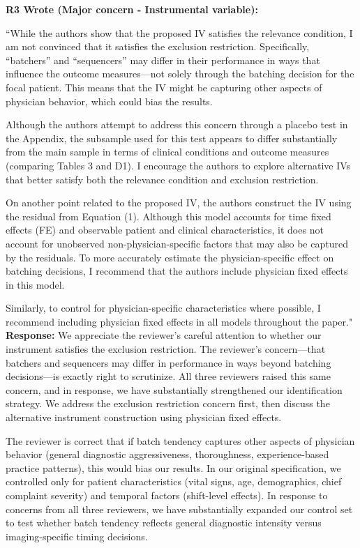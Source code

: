\documentclass[11pt]{article}
\newenvironment{quote2}
{ \bigskip
\noindent
         \small\em
         \baselineskip=14pt
}
\newcommand{\1}{\hbox{\rm 1\kern-.35em 1}}
\begin{document}
\begin{quote2}
\textbf{R3 Wrote (Major concern - Instrumental variable):}  

\noindent``While the authors show that the proposed IV satisfies the relevance condition, I am not convinced that it satisfies the exclusion restriction. Specifically, “batchers” and “sequencers” may differ in their performance in ways that influence the outcome measures—not solely through the batching decision for the focal patient. This means that the IV might be capturing other aspects of physician behavior, which could bias the results.

Although the authors attempt to address this concern through a placebo test in the Appendix, the subsample used for this test appears to differ substantially from the main sample in terms of clinical conditions and outcome measures (comparing Tables 3 and D1). I encourage the authors to explore alternative IVs that better satisfy both the relevance condition and exclusion restriction.

On another point related to the proposed IV, the authors construct the IV using the residual from Equation (1). Although this model accounts for time fixed effects (FE) and observable patient and clinical characteristics, it does not account for unobserved non-physician-specific factors that may also be captured by the residuals. To more accurately estimate the physician-specific effect on batching decisions, I recommend that the authors include physician fixed effects in this model.

Similarly, to control for physician-specific characteristics where possible, I recommend including physician fixed effects in all models throughout the paper."
\end{quote2}

\noindent\textbf{Response:} \color{blue}We appreciate the reviewer's careful attention to whether our instrument satisfies the exclusion restriction. The reviewer's concern—that batchers and sequencers may differ in performance in ways beyond batching decisions—is exactly right to scrutinize. All three reviewers raised this same concern, and in response, we have substantially strengthened our identification strategy. We address the exclusion restriction concern first, then discuss the alternative instrument construction using physician fixed effects.

The reviewer is correct that if batch tendency captures other aspects of physician behavior (general diagnostic aggressiveness, thoroughness, experience-based practice patterns), this would bias our results. In our original specification, we controlled only for patient characteristics (vital signs, age, demographics, chief complaint severity) and temporal factors (shift-level effects). In response to concerns from all three reviewers, we have substantially expanded our control set to test whether batch tendency reflects general diagnostic intensity versus imaging-specific timing decisions.
\end{document}
